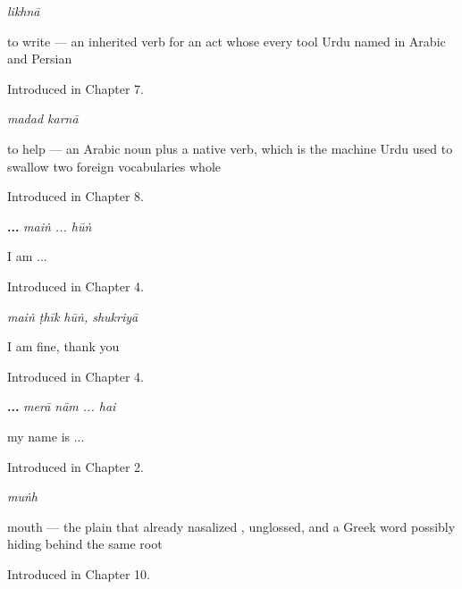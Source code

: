 \noindent\begin{minipage}[t]{\linewidth}
\raggedright
\textbf{}\enspace\emph{likhnā}\par
\small to write — an inherited verb for an act whose every tool Urdu named in Arabic and Persian\par
\footnotesize Introduced in Chapter 7.
\end{minipage}\par\medskip

\noindent\begin{minipage}[t]{\linewidth}
\raggedright
\textbf{ }\enspace\emph{madad karnā}\par
\small to help — an Arabic noun plus a native verb, which is the machine Urdu used to swallow two foreign vocabularies whole\par
\footnotesize Introduced in Chapter 8.
\end{minipage}\par\medskip

\noindent\begin{minipage}[t]{\linewidth}
\raggedright
\textbf{ ... }\enspace\emph{maiṅ ... hūṅ}\par
\small I am ...\par
\footnotesize Introduced in Chapter 4.
\end{minipage}\par\medskip

\noindent\begin{minipage}[t]{\linewidth}
\raggedright
\textbf{   }\enspace\emph{maiṅ ṭhīk hūṅ, shukriyā}\par
\small I am fine, thank you\par
\footnotesize Introduced in Chapter 4.
\end{minipage}\par\medskip

\noindent\begin{minipage}[t]{\linewidth}
\raggedright
\textbf{  ... }\enspace\emph{merā nām ... hai}\par
\small my name is ...\par
\footnotesize Introduced in Chapter 2.
\end{minipage}\par\medskip

\noindent\begin{minipage}[t]{\linewidth}
\raggedright
\textbf{}\enspace\emph{muṅh}\par
\small mouth — the plain  that already nasalized , unglossed, and a Greek word possibly hiding behind the same root\par
\footnotesize Introduced in Chapter 10.
\end{minipage}\par\medskip

